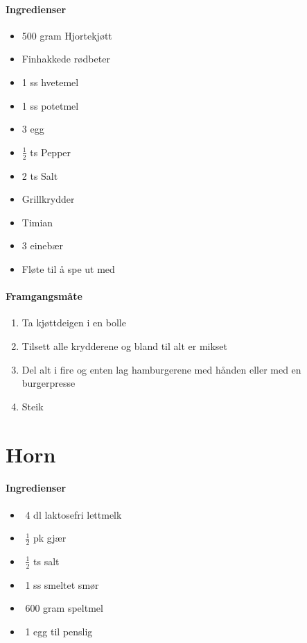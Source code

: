 \documentclass[12pt,a4paper]{book}
\begin{document}
\paragraph{Ingredienser}
\begin{itemize}[noitemsep]
	\item 500 gram Hjortekjøtt
	\item	Finhakkede rødbeter
	\item	1 ss hvetemel
	\item	1 ss potetmel
	\item	3 egg
	\item	 $\frac{1}{2}$  ts Pepper
	\item	2 ts Salt
	\item	Grillkrydder
	\item	Timian
	\item	3 einebær
	\item	Fløte til å spe ut med
\end{itemize}

\paragraph{Framgangsmåte}
\begin{enumerate}[noitemsep]
	\item Ta kjøttdeigen i en bolle
	\item Tilsett alle krydderene og bland til alt er mikset
	\item Del alt i fire og enten lag hamburgerene med hånden eller med en burgerpresse
	\item Steik
\end{enumerate}
\clearpage{}
\clearpage{}\section{﻿Horn}


\paragraph{Ingredienser}
\begin{itemize}[noitemsep]
	\item﻿ 4 dl laktosefri lettmelk
	\item﻿ $\frac{1}{2}$ pk gjær
	\item﻿  $\frac{1}{2}$  ts salt
	\item﻿ 1 ss smeltet smør
	\item﻿ 600 gram speltmel
	\item﻿ 1 egg til penslig
\end{itemize}
\end{document}
